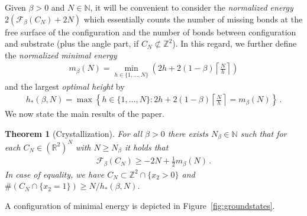 \documentclass[reqno]{amsart}
\theoremstyle{plain}
\newtheorem{theorem}{Theorem}[section]
\theoremstyle{definition}
\numberwithin{equation}{section}
\newcommand{\Z}{\mathbb{Z}}
\newcommand{\R}{\mathbb{R}}
\begin{document}
 Given $\beta >0 $ and $N \in \mathbb{N}$, it will be convenient to
 consider the \emph{normalized energy}  $ 2  (\mathcal{F}_\beta(C_N)
 +2N)$ which essentially counts the number of missing bonds at the
  free  surface of the configuration and the number of bonds
 between configuration and substrate  (plus the angle part, if
 $C_N \not \subset \Z^2$).  In this regard, we further define the \emph{normalized  minimal energy} 
\begin{align}\label{def:mbetan}
m_\beta(N) = \min_{h \in \{1,\ldots,N\}} \left(2h +  2(1-\beta) \left\lceil
\frac{N}{h} \right\rceil \right)
\end{align}
 and the largest \emph{optimal height} by 
\begin{align}\label{hstern}
 h_*(\beta,N) =\max\left\{h  \in \{1,\ldots,N\}  \colon 2h + 2(1-\beta) \left\lceil
\frac{N}{h} \right\rceil =m_\beta(N) \right\}\,.
\end{align}
We now  state the main results of the paper.   

\begin{theorem}[Crystallization]\label{thm:crystallization}
For all $\beta >0  $ there exists $N_\beta \in \mathbb{N}$ such that for each $C_N \in (\R^2)^N$ with $N \geq N_\beta$  it holds that 
 \begin{align}\label{eq: main claim0}
 \mathcal{F}_\beta(C_N) \geq  -2N + \frac{1}{2}   m_\beta(N)\,.
\end{align}
In case of equality, we have  $C_N \subset \mathbb{Z}^2 \cap
\{x_2>0\}$  and  $\#\left(C_N \cap \{x_2=1\}\right)\geq N/h_*(\beta,N) $.  
\end{theorem}
A configuration of minimal energy is depicted in Figure~\ref{fig:groundstates}.
\end{document}
